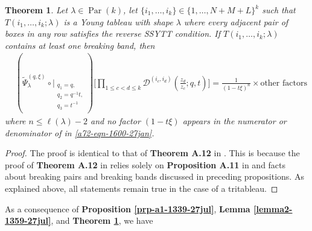 \documentclass[12pt,reqno,a4paper]{amsart}
\newcommand{\comp}{\circ}
\newcommand{\cals}[1]{\mathcal{#1}}
\numberwithin{equation}{section}
\newtheorem{thm}{Theorem}[section]
\newcommand{\dualmap}{
\widetilde{\Psi}^{(q,\xi)}_{\lambda}
}
\theoremstyle{definition}
\begin{document}
\begin{thm}
\label{thma14-1742-31jul}
Let $\lambda \in \operatorname{Par}(k)$, let $\{i_1,\dots,i_k\} \in \{1,\dots,N+M+L\}^k$ such that $T(i_1,\dots,i_k;\lambda)$ is a Young tableau with shape $\lambda$ where every adjacent pair of boxes in any row satisfies the reverse SSYTT condition. If $T(i_1,\dots,i_k;\lambda)$ contains at least one breaking band, then
\begin{align}
	&(
	\dualmap
	\comp 
	\bigg|_{
		\substack{
			q_1 = q, \\
			q_2 = q^{-1}t,\\
			q_3 = t^{-1} \\
		}
	}
	)
	\Bigg[
	\prod_{1 \leq c < d \leq k}
	\cals{D}^{(i_c,i_d)}\left(
	\frac{z_d}{z_c}
	; q, t
	\right)
	\Bigg]
	= 
	\frac{1}{	(1-t\xi)^n	}
	\times
	\text{other factors}
	\label{a72-eqn-1600-27jan}
\end{align}
where $n \leq \ell(\lambda) - 2$ and no factor $(1 - t\xi)$ appears in the numerator or denominator of  in \eqref{a72-eqn-1600-27jan}. 
\end{thm}
\begin{proof}
The proof is identical to that of \textbf{Theorem A.12} in \cite{CSW2025}. This is because the proof of \textbf{Theorem A.12} in \cite{CSW2025} relies solely on \textbf{Proposition A.11} in \cite{CSW2025} and facts about breaking pairs and breaking bands discussed in preceding propositions. As explained above, all statements remain true in the case of a tritableau.
\end{proof}

As a consequence of \textbf{Proposition \ref{prp-a1-1339-27jul}}, 
\textbf{Lemma \ref{lemma2-1359-27jul}}, 
and \textbf{Theorem \ref{thma14-1742-31jul}}, we have 
\end{document}
